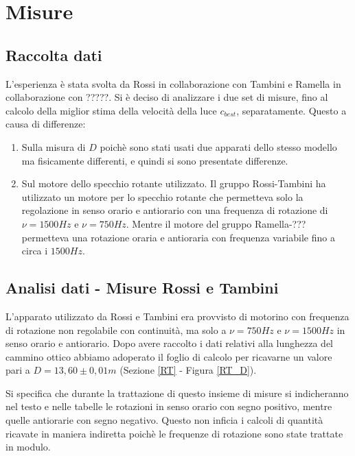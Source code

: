 \documentclass{article}
\begin{document}

\section{Misure}

\subsection{Raccolta dati}
L'esperienza è stata svolta da Rossi in collaborazione con Tambini e Ramella in collaborazione con ?????. Si è deciso di analizzare i due set di misure, fino al calcolo 
della miglior stima della velocità della luce $c_{best}$, separatamente. Questo a causa di differenze:

\begin{enumerate}
    \item Sulla misura di $D$ poichè sono stati usati due apparati dello stesso modello ma fisicamente differenti, e quindi si sono presentate differenze.
    \item Sul motore dello specchio rotante utilizzato. Il gruppo Rossi-Tambini ha utilizzato un motore per lo specchio rotante che permetteva solo la regolazione in 
            senso orario e antiorario con una frequenza di rotazione di $\nu = 1500 Hz$ e $\nu = 750 Hz$. Mentre il motore del gruppo Ramella-??? permetteva una rotazione
            oraria e antioraria con frequenza variabile fino a circa i $1500 Hz$.
\end{enumerate}



\subsection{Analisi dati - Misure Rossi e Tambini}

L'apparato utilizzato da Rossi e Tambini era provvisto di motorino con frequenza di rotazione non regolabile con continuità, ma solo a $\nu=750Hz$ e $\nu=1500Hz$
in senso orario e antiorario. Dopo avere raccolto i dati relativi alla lunghezza del cammino ottico abbiamo adoperato il foglio di calcolo per ricavarne un valore pari 
a $D = 13,60 \pm 0,01 m$ (Sezione \ref{RT} - Figura \ref{RT_D}).

Si specifica che durante la trattazione di questo insieme di misure si indicheranno nel testo e nelle tabelle le rotazioni in senso orario con segno positivo, mentre 
quelle antiorarie con segno negativo. Questo non inficia i calcoli di quantità ricavate in maniera indiretta poichè le frequenze di rotazione sono state trattate in
modulo.
\end{document}

